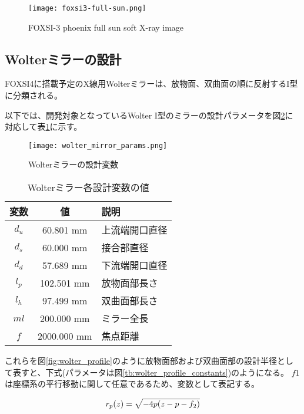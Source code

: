 \begin{figure}[h]
\centering
\texttt{[image: foxsi3-full-sun.png]}
\caption{FOXSI-3 phoenix full sun soft X-ray image \cite{weko_20796_1}}
\label{fig:foxsi-fullsun-image}
\end{figure}

\subsection{Wolterミラーの設計}
\label{chap1_wolter_arrangement}
FOXSI4に搭載予定のX線用Wolterミラーは、放物面、双曲面の順に反射するI型に分類される。

以下では、開発対象となっているWolter I型のミラーの設計パラメータを図\ref{fig:wolter_params}に対応して表\ref{tb:wolter_params}に示す。

\begin{figure}[h!]
\centering
\texttt{[image: wolter\_mirror\_params.png]}
\caption{Wolterミラーの設計変数}
\label{fig:wolter_params}
\end{figure}

\begin{table}[ht]
\begin{center}
  \begin{tabular}{|c|c|l|} \hline
    変数 & 値 & 説明 \\ \hline
    $d_u$ & 60.801 mm & 上流端開口直径 \\
    $d_s$ & 60.000 mm & 接合部直径 \\
    $d_d$ & 57.689 mm & 下流端開口直径 \\
    $l_p$ & 102.501 mm & 放物面部長さ \\
    $l_h$ & 97.499 mm & 双曲面部長さ \\
    $ml$ & 200.000 mm & ミラー全長 \\
    $f$ & 2000.000 mm & 焦点距離 \\ \hline
  \end{tabular}
  \caption{Wolterミラー各設計変数の値}
  \label{tb:wolter_params}
\end{center}
\end{table}

これらを図\ref{fig:wolter_profile}のように放物面部および双曲面部の設計半径として表すと、下式(パラメータは図\ref{tb:wolter_profile_constants})のようになる。
$f1$は座標系の平行移動に関して任意であるため、変数として表記する。

\begin{equation}
    r_p(z) = \sqrt{ -4p(z - p - f_2) } \\
\end{equation}

